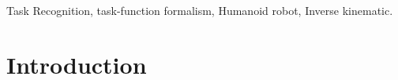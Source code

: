 \documentclass[journal]{IEEEtran}
\begin{document}
\begin{IEEEkeywords}
Task Recognition, task-function formalism, Humanoid robot, Inverse kinematic.
\end{IEEEkeywords}

\IEEEpeerreviewmaketitle

\section{Introduction}
%
%
%
%
\end{document}
